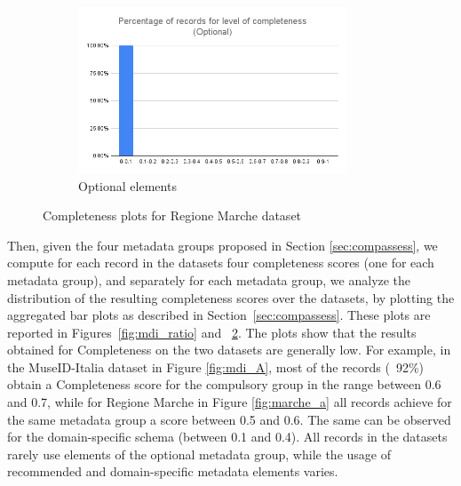 \documentclass[epsfig,a4paper,12pt,titlepage]{book}
\begin{document}
\begin{figure}[h]
        \hfill
        \begin{subfigure}[b]{0.475\textwidth}   
            \centering 
            \includegraphics[width=8cm]{marche_optional.png}
            \caption[]%
            {{\small Optional elements}}    
            \label{fig:marche_d}
        \end{subfigure}
        \caption[ Completeness plots for Regione Marche dataset ]
        {\small Completeness plots for Regione Marche dataset } 
        \label{fig:marche_ratio}
    \end{figure}
    
Then, given the four metadata groups proposed in Section \ref{sec:compassess}, we compute for each record in the datasets four completeness scores (one for each metadata group), and separately for each metadata group, we analyze the distribution of the resulting completeness scores over the datasets, by plotting the aggregated bar plots as described in Section~\ref{sec:compassess}. These plots are reported in Figures~\ref{fig:mdi_ratio} and
~\ref{fig:marche_ratio}. 
The plots show that the results obtained for Completeness on the two datasets are generally low. For example, in the MuseID-Italia dataset in Figure \ref{fig:mdi_A}, most of the records (~92\%) obtain a Completeness score for the compulsory group in the range between 0.6 and 0.7, while for Regione Marche in Figure \ref{fig:marche_a} all records achieve for the same metadata group a score between 0.5 and 0.6. The same can be observed for the domain-specific schema (between 0.1 and 0.4). All records in the datasets rarely use elements of the optional metadata group, while the usage of recommended and domain-specific metadata elements varies.
\end{document}
